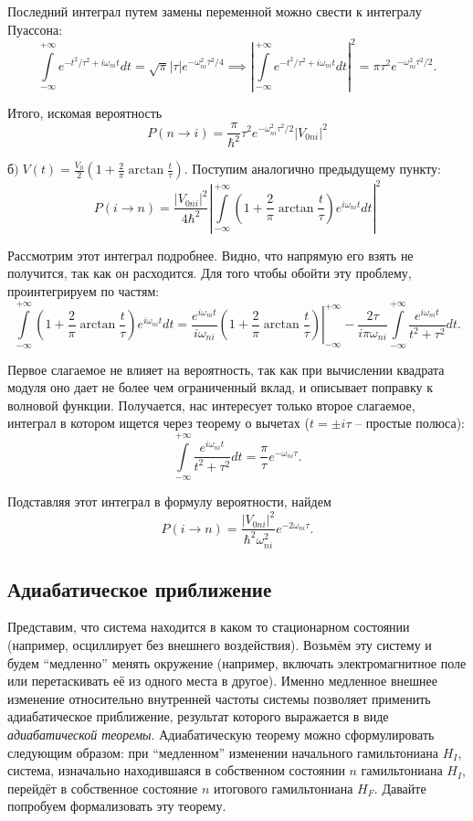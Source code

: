 Последний интеграл путем замены переменной можно свести к интегралу Пуассона:
\[
  \int\limits_{-\infty}^{+\infty}e^{-t^2/\tau^2+i\omega_{ni}t}dt = \sqrt{\pi}|\tau|e^{-\omega_{ni}^2\tau^2/4} \implies \left|\int\limits_{-\infty}^{+\infty}e^{-t^2/\tau^2+i\omega_{ni}t}dt\right|^2 = \pi\tau^2 e^{-\omega_{ni}^2\tau^2/2}.
\]

Итого, искомая вероятность
\[
  P(n\to i) = \frac{\pi}{\hbar^2}\tau^2e^{-\omega_{ni}^2\tau^2/2}\left|V_{0ni}\right|^2
\]

$\textit{б}) \; V(t) =
  \frac{V_0}{2}\left(1+\frac{2}{\pi}\arctan\frac{t}{\tau}\right)$. Поступим
аналогично предыдущему пункту:
\[
  P(i\to n) = \frac{|V_{0ni}|^2}{4\hbar^2}\left|\int\limits_{-\infty}^{+\infty}\left(1+\frac{2}{\pi}\arctan\frac{t}{\tau}\right)e^{i\omega_{ni}t}dt\right|^2
\]

Рассмотрим этот интеграл подробнее. Видно, что напрямую его взять не получится,
так как он расходится. Для того чтобы обойти эту проблему, проинтегрируем по
частям:
\[
  \int\limits_{-\infty}^{+\infty}\left(1+\frac{2}{\pi}\arctan\frac{t}{\tau}\right)e^{i\omega_{ni}t}dt = \left.\frac{e^{i\omega_{ni}t}}{i\omega_{ni}}\left(1+\frac{2}{\pi}\arctan\frac{t}{\tau}\right)\right|_{-\infty}^{+\infty}-\frac{2\tau}{i\pi\omega_{ni}}\int\limits_{-\infty}^{+\infty}\frac{e^{i\omega_{ni}t}}{t^2+\tau^2}dt.
\]

Первое слагаемое не влияет на вероятность, так как при вычислении квадрата
модуля оно дает не более чем ограниченный вклад, и описывает поправку к
волновой функции. Получается, нас интересует только второе слагаемое, интеграл
в котором ищется через теорему о вычетах ($t=\pm i\tau$ -- простые полюса):
\[
  \int\limits_{-\infty}^{+\infty}\frac{e^{i\omega_{ni}t}}{t^2+\tau^2}dt = \frac{\pi}{\tau}e^{-\omega_{ni}\tau}.
\]

Подставляя этот интеграл в формулу вероятности, найдем
\[
  P(i\to n) = \frac{|V_{0ni}|^2}{\hbar^2\omega_{ni}^2}e^{-2\omega_{ni}\tau}.
\]
\qedsq

\subsection{Адиабатическое приближение}
Представим, что система находится в каком то стационарном состоянии (например,
осциллирует без внешнего воздействия). Возьмём эту систему и будем ``медленно''
менять окружение (например, включать электромагнитное поле или перетаскивать её
из одного места в другое). Именно медленное внешнее изменение относительно
внутренней частоты системы позволяет применить адиабатическое приближение,
результат которого выражается в виде \textit{адиабатической теоремы}.
Адиабатическую теорему можно сформулировать следующим образом: при
``медленном'' изменении начального гамильтониана $H_I$, система, изначально
находившаяся в собственном состоянии $n$ гамильтониана $H_I$, перейдёт в
собственное состояние $n$ итогового гамильтониана $H_F$. Давайте попробуем
формализовать эту теорему.

